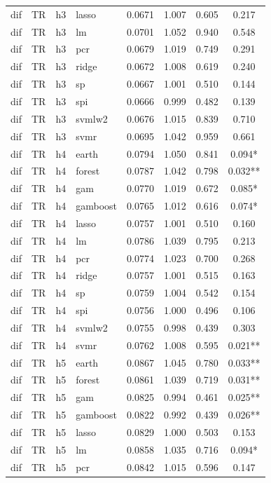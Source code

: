 \begin{ThreePartTable}
\begin{longtable}[t]{llclcccc}
dif & TR & h3 & lasso & 0.0671 & 1.007 & 0.605 & 0.217\\
dif & TR & h3 & lm & 0.0701 & 1.052 & 0.940 & 0.548\\
dif & TR & h3 & pcr & 0.0679 & 1.019 & 0.749 & 0.291\\
dif & TR & h3 & ridge & 0.0672 & 1.008 & 0.619 & 0.240\\
dif & TR & h3 & sp & 0.0667 & 1.001 & 0.510 & 0.144\\
dif & TR & h3 & spi & 0.0666 & 0.999 & 0.482 & 0.139\\
dif & TR & h3 & svmlw2 & 0.0676 & 1.015 & 0.839 & 0.710\\
dif & TR & h3 & svmr & 0.0695 & 1.042 & 0.959 & 0.661\\
\addlinespace
dif & TR & h4 & earth & 0.0794 & 1.050 & 0.841 & 0.094*\\
dif & TR & h4 & forest & 0.0787 & 1.042 & 0.798 & 0.032**\\
dif & TR & h4 & gam & 0.0770 & 1.019 & 0.672 & 0.085*\\
dif & TR & h4 & gamboost & 0.0765 & 1.012 & 0.616 & 0.074*\\
dif & TR & h4 & lasso & 0.0757 & 1.001 & 0.510 & 0.160\\
dif & TR & h4 & lm & 0.0786 & 1.039 & 0.795 & 0.213\\
dif & TR & h4 & pcr & 0.0774 & 1.023 & 0.700 & 0.268\\
dif & TR & h4 & ridge & 0.0757 & 1.001 & 0.515 & 0.163\\
dif & TR & h4 & sp & 0.0759 & 1.004 & 0.542 & 0.154\\
dif & TR & h4 & spi & 0.0756 & 1.000 & 0.496 & 0.106\\
dif & TR & h4 & svmlw2 & 0.0755 & 0.998 & 0.439 & 0.303\\
dif & TR & h4 & svmr & 0.0762 & 1.008 & 0.595 & 0.021**\\
\addlinespace
dif & TR & h5 & earth & 0.0867 & 1.045 & 0.780 & 0.033**\\
dif & TR & h5 & forest & 0.0861 & 1.039 & 0.719 & 0.031**\\
dif & TR & h5 & gam & 0.0825 & 0.994 & 0.461 & 0.025**\\
dif & TR & h5 & gamboost & 0.0822 & 0.992 & 0.439 & 0.026**\\
dif & TR & h5 & lasso & 0.0829 & 1.000 & 0.503 & 0.153\\
dif & TR & h5 & lm & 0.0858 & 1.035 & 0.716 & 0.094*\\
dif & TR & h5 & pcr & 0.0842 & 1.015 & 0.596 & 0.147\\

\end{longtable}
\end{ThreePartTable}

